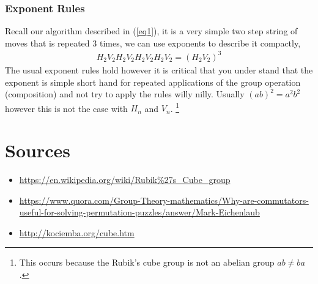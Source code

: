 \documentclass{article}
\begin{document}
\subsubsection{Exponent Rules}
Recall our algorithm described in (\ref{eq1}), it is a very simple two step string of moves that is repeated 3 times, we can use exponents to describe it compactly,
\begin{align}
    H_{2}V_{2}H_{2}V_{2}H_{2}V_{2}H_{2}V_{2}=(H_{2}V_{2})^{3}
\end{align}
The usual exponent rules hold however it is critical that you under stand that the exponent is simple short hand for repeated applications of the group operation (composition) and not try to apply the rules willy nilly.
Usually $(ab)^2=a^2b^2$ however this is not the case with $H_{n}$ and $V_{n}$.
\footnote{This occurs because the Rubik's cube group is not an abelian group $ab\neq ba$.}
\section{Sources}
\begin{itemize}
    \item \url{https://en.wikipedia.org/wiki/Rubik\%27s\_Cube\_group}
    \item \url{https://www.quora.com/Group-Theory-mathematics/Why-are-commutators-useful-for-solving-permutation-puzzles/answer/Mark-Eichenlaub}
    \item \url{http://kociemba.org/cube.htm}
\end{itemize}
\end{document}
